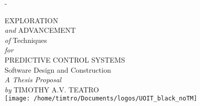 \begin{titlingpage}
	\calccentering{\unitlength}
	\begin{adjustwidth*}{\unitlength}{-\unitlength}
		\null
		\vfill
		\begin{center}
			\Large
			{%
      EXPLORATION\\ \textit{and} ADVANCEMENT\\
      \textit{of} Techniques\\
      \textit{for}\\
      PREDICTIVE CONTROL SYSTEMS\\
      Software Design and Construction
      }\\[6ex]
			{\large\itshape A Thesis Proposal}\\[4ex]
			{\normalsize\textit{by} \uppercase{ Timothy A.V. Teatro}}\\[1ex]
			\vfill
			\texttt{[image: /home/timtro/Documents/logos/UOIT\_black\_noTM]}
		\end{center}
		\vfill
	\end{adjustwidth*}
\end{titlingpage}

